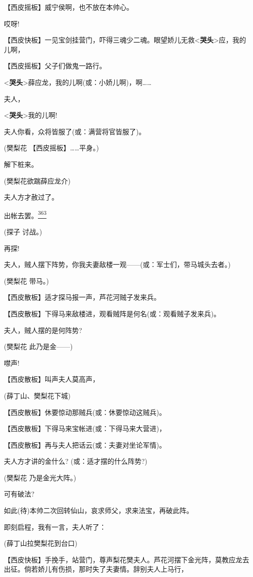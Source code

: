 【西皮摇板】威宁侯啊，也不放在本帅心。

哎呀!

【西皮快板】一见宝剑挂营门，吓得三魂少二魂。眼望娇儿无救\textless{}\textbf{哭头}\textgreater{}应，我的儿啊，

【西皮摇板】父子们做鬼一路行。

\textless{}\textbf{哭头}\textgreater{}薛应龙，我的儿啊(或：小娇儿啊)，啊\ldots{}\ldots{}

夫人，

\textless{}\textbf{哭头}\textgreater{}我的儿啊!

夫人你看，众将皆服了(或：满营将官皆服了)。

(樊梨花 【西皮摇板】\ldots{}\ldots{}平身。)

解下桩来。

(樊梨花欲踹薛应龙介)

夫人方才赦过了。

出帐去罢。\protect\hyperlink{fn363}{\textsuperscript{363}}

(探子 讨战。)

再探!

夫人，贼人摆下阵势，你我夫妻敌楼一观------(或：军士们，带马城头去者。)

(樊梨花 带马。)

【西皮散板】适才探马报一声，芦花河贼子发来兵。

【西皮散板】下得马来敌楼进，观看贼阵是何名(或：观看贼子发来兵)。

夫人，贼人摆的是何阵势?

(樊梨花 此乃是金------)

噤声!

【西皮散板】叫声夫人莫高声，

(薛丁山、樊梨花下城)

【西皮散板】休要惊动那贼兵(或：休要惊动这贼兵)。

【西皮散板】下得马来宝帐进(或：下得马来大营进)，

【西皮散板】再与夫人把话云(或：夫妻对坐论军情)。

夫人方才讲的金什么? (或：适才摆的什么阵势?)

(樊梨花 乃是金光大阵。)

可有破法?

如此(待)本帅二次回转仙山，哀求师父，求来法宝，再破此阵。

即刻启程，我有一言，夫人听了：

(薛丁山拉樊梨花到台口)

【西皮快板】手挽手，站营门，尊声梨花樊夫人。芦花河摆下金光阵，莫教应龙去出征。倘若娇儿有伤损，那时失了夫妻情。辞别夫人上马行，

